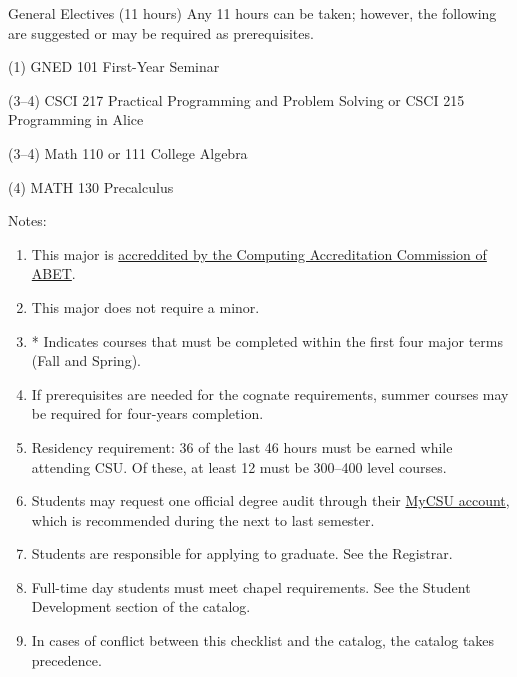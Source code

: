 \begin{reqgroup}{General Electives (11 hours)}
Any 11 hours can be taken; however, the following are suggested or may be required as prerequisites.
\begin{checklist}
\begin{minipage}[t]{\linewidth}
	\item (1)	GNED 101	First-Year Seminar
	\item (3--4)	CSCI 217	Practical Programming and Problem Solving or CSCI 215	Programming in Alice
	\item (3--4) Math 110 or 111 College Algebra
	\item (4) MATH 130 Precalculus
\end{minipage}
\end{checklist}
\end{reqgroup}

Notes:%
\begin{enumerate}\footnotesize
	\item This major is
		\href{https://www.abet.org/accreditation/what-is-accreditation/why-abet-accreditation-matters/}{accreddited by the Computing Accreditation Commission of ABET}.
	\item This major does not require a minor.
	\item * Indicates courses that must be completed within the first four major terms (Fall and Spring).
	\item If prerequisites are needed for the cognate requirements, summer courses may be required for four-years completion.
	\item Residency requirement: 36 of the last 46 hours must be earned while attending CSU. Of these, at least 12 must be 300--400 level courses.
	\item Students may request one official degree audit through their \href{https://portal.csuniv.edu/}{MyCSU account}, which is recommended during the next to last semester.
	\item Students are responsible for applying to graduate. See the Registrar.
	\item Full-time day students must meet chapel requirements. See the Student Development section of the catalog.
	\item In cases of conflict between this checklist and the catalog, the catalog takes precedence.
\end{enumerate}